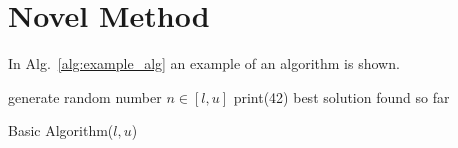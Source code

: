 \chapter{Novel Method}
\label{ch:method}

In Alg.~\ref{alg:example_alg} an example of an algorithm is shown.

\begin{algorithm} 
\begin{algorithmic}[1]
\STATE generate random number $n \in [l, u]$
\STATE print(42)
\ENDIF
\ENDWHILE
\RETURN best solution found so far
\end{algorithmic}
\caption{Basic Algorithm($l, u$)}
\label{alg:example_alg}
\end{algorithm}  



